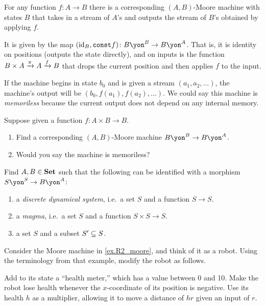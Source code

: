 \documentclass[Book-Poly]{subfiles}
\begin{document}
\begin{example}\label{ex.funs_to_moore}
For any function $f\colon A\to B$ there is a corresponding $(A,B)$-Moore machine with states $B$ that takes in a stream of $A$'s and outputs the stream of $B$'s obtained by applying $f$. 

It is given by the map $(\id_B,\texttt{const} f)\colon B\yon^B\to B\yon^A$. That is, it is identity on positions (outputs the state directly), and on inputs is the function $B\times A\To{\pi}A\To{f} B$ that drops the current position and then applies $f$ to the input.

If the machine begins in state $b_0$ and is given a stream $(a_1,a_2,\ldots)$, the machine's output will be $(b_0,f(a_1),f(a_2),\ldots)$. We could say this machine is \emph{memoriless} because the current output does not depend on any internal memory.
\end{example}

\begin{exercise}\label{exc.funs_to_moore}
Suppose given a function $f\colon A\times B\to B$.
\begin{enumerate}
	\item Find a corresponding $(A,B)$-Moore machine $B\yon^B\to B\yon^A$.
	\item Would you say the machine is memoriless?
\qedhere
\end{enumerate}
\end{exercise}

\begin{exercise}
Find $A,B\in\smset$ such that the following can be identified with a morphism $S\yon^S\to B\yon^A$:
\begin{enumerate}
	\item a \emph{discrete dynamical system}, i.e.\ a set $S$ and a function $S\to S$.
	\item a \emph{magma}, i.e.\ a set $S$ and a function $S\times S\to S$.
	\item a set $S$ and a subset $S'\ss S$.
\qedhere
\end{enumerate}
\end{exercise}

\begin{exercise}
Consider the Moore machine in \cref{ex.R2_moore}, and think of it as a robot. Using the terminology from that example, modify the robot as follows.

Add to its state a ``health meter,'' which has a value between 0 and 10. Make the robot lose health whenever the $x$-coordinate of its position is negative. Use its health $h$ as a multiplier, allowing it to move a distance of $hr$ given an input of $r$.
\end{exercise}
\end{document}
